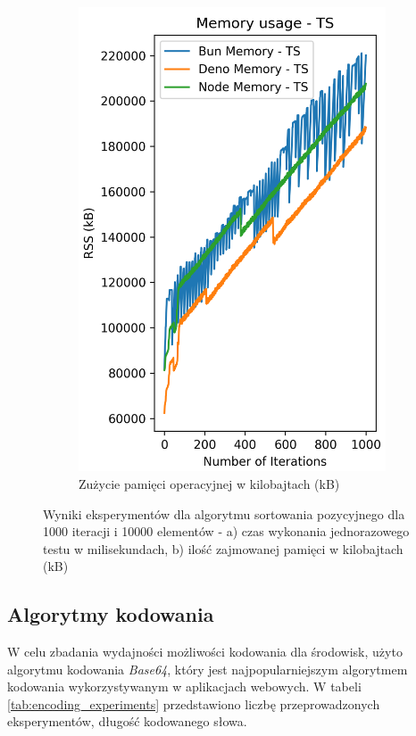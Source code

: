 \begin{figure}[H]
\begin{subfigure}[b]{0.4\textwidth}
    \includegraphics[width=\textwidth]{Figures/sorting/sorting_radix_1000_10000_ts_memory.png}
    \caption{Zużycie pamięci operacyjnej w kilobajtach (kB)}
    \label{fig:radix_sorting_e4_ts_memory}
  \end{subfigure}
  \hfill
  \caption{Wyniki eksperymentów dla algorytmu sortowania pozycyjnego dla 1000 iteracji i 10000 elementów - a) czas wykonania jednorazowego testu w milisekundach, b) ilość zajmowanej pamięci w kilobajtach (kB)}
  \label{fig:radix_sorting_e4_ts}
\end{figure}

\subsection{Algorytmy kodowania}
W celu zbadania wydajności możliwości kodowania dla środowisk, użyto algorytmu kodowania \textit{Base64}, który jest najpopularniejszym algorytmem kodowania wykorzystywanym w aplikacjach webowych. W tabeli \ref{tab:encoding_experiments} przedstawiono liczbę przeprowadzonych eksperymentów, długość kodowanego słowa.


